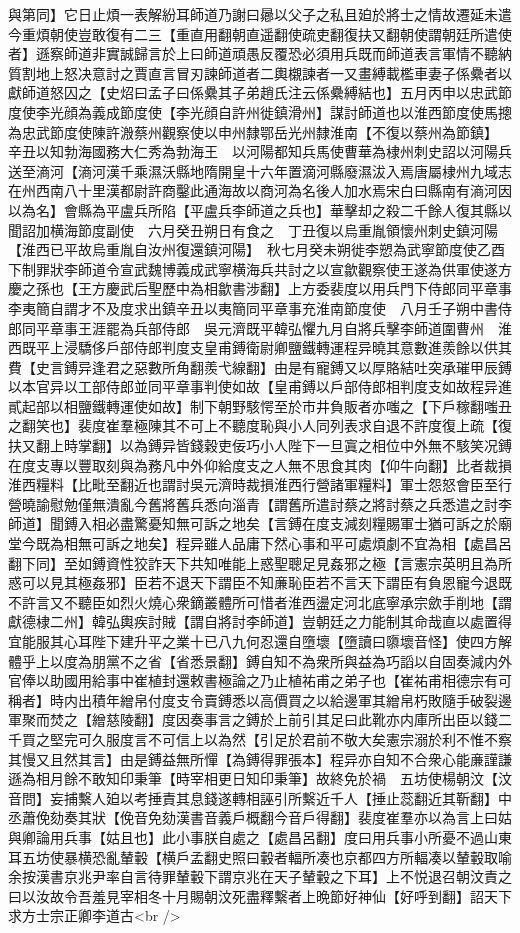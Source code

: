 與第同】它日止煩一表解紛耳師道乃謝曰曏以父子之私且廹於將士之情故遷延未遣今重煩朝使豈敢復有二三【重直用翻朝直遥翻使疏吏翻復扶又翻朝使謂朝廷所遣使者】遜察師道非實誠歸言於上曰師道頑愚反覆恐必須用兵既而師道表言軍情不聽納質割地上怒决意討之賈直言冒刃諫師道者二輿櫬諫者一又畫縛載檻車妻子係纍者以獻師道怒囚之【史炤曰孟子曰係纍其子弟趙氏注云係纍縛結也】五月丙申以忠武節度使李光顔為義成節度使【李光顔自許州徙鎮滑州】謀討師道也以淮西節度使馬摠為忠武節度使陳許溵蔡州觀察使以申州隸鄂岳光州隸淮南【不復以蔡州為節鎮】　辛丑以知勃海國務大仁秀為勃海王　以河陽都知兵馬使曹華為棣州刺史詔以河陽兵送至滳河【滳河漢千乘濕沃縣地隋開皇十六年置滴河縣廢濕沷入焉唐屬棣州九域志在州西南八十里漢都尉許商鑿此通海故以商河為名後人加水焉宋白曰縣南有滳河因以為名】會縣為平盧兵所陷【平盧兵李師道之兵也】華擊却之殺二千餘人復其縣以聞詔加横海節度副使　六月癸丑朔日有食之　丁丑復以烏重胤領懷州刺史鎮河陽【淮西已平故烏重胤自汝州復還鎮河陽】　秋七月癸未朔徙李愬為武寧節度使乙酉下制罪狀李師道令宣武魏博義成武寧横海兵共討之以宣歙觀察使王遂為供軍使遂方慶之孫也【王方慶武后聖歷中為相歙書涉翻】上方委裴度以用兵門下侍郎同平章事李夷簡自謂才不及度求出鎮辛丑以夷簡同平章事充淮南節度使　八月壬子朔中書侍郎同平章事王涯罷為兵部侍郎　吳元濟既平韓弘懼九月自將兵擊李師道圍曹州　淮西既平上浸驕侈戶部侍郎判度支皇甫鎛衛尉卿鹽鐵轉運程异曉其意數進羨餘以供其費【史言鎛异逢君之惡數所角翻羨弋線翻】由是有寵鎛又以厚賂結吐突承璀甲辰鎛以本官异以工部侍郎並同平章事判使如故【皇甫鎛以戶部侍郎相判度支如故程异進貳起部以相鹽鐵轉運使如故】制下朝野駭愕至於市井負販者亦嗤之【下戶稼翻嗤丑之翻笑也】裴度崔羣極陳其不可上不聽度恥與小人同列表求自退不許度復上疏【復扶又翻上時掌翻】以為鎛异皆錢穀吏佞巧小人陛下一旦寘之相位中外無不駭笑况鎛在度支專以豐取刻與為務凡中外仰給度支之人無不思食其肉【仰牛向翻】比者裁損淮西糧料【比毗至翻近也謂討吳元濟時裁損淮西行營諸軍糧料】軍士怨怒會臣至行營曉諭慰勉僅無潰亂今舊將舊兵悉向淄青【謂舊所遣討蔡之將討蔡之兵悉遣之討李師道】聞鎛入相必盡驚憂知無可訴之地矣【言鎛在度支減刻糧賜軍士猶可訴之於廟堂今既為相無可訴之地矣】程异雖人品庸下然心事和平可處煩劇不宜為相【處昌呂翻下同】至如鎛資性狡詐天下共知唯能上惑聖聰足見姦邪之極【言憲宗英明且為所惑可以見其極姦邪】臣若不退天下謂臣不知亷恥臣若不言天下謂臣有負恩寵今退既不許言又不聽臣如烈火燒心衆鏑叢體所可惜者淮西盪定河北底寧承宗歛手削地【謂獻德棣二州】韓弘輿疾討賊【謂自將討李師道】豈朝廷之力能制其命哉直以處置得宜能服其心耳陛下建升平之業十已八九何忍還自墮壞【墮讀曰隳壞音怪】使四方解體乎上以度為朋黨不之省【省悉景翻】鎛自知不為衆所與益為巧謟以自固奏減内外官俸以助國用給事中崔植封還敕書極論之乃止植祐甫之弟子也【崔祐甫相德宗有可稱者】時内出積年繒帛付度支令賣鎛悉以高價買之以給邊軍其繒帛朽敗隨手破裂邊軍聚而焚之【繒慈陵翻】度因奏事言之鎛於上前引其足曰此靴亦内庫所出臣以錢二千買之堅完可久服度言不可信上以為然【引足於君前不敬大矣憲宗溺於利不惟不察其慢又且然其言】由是鎛益無所憚【為鎛得罪張本】程异亦自知不合衆心能亷謹謙遜為相月餘不敢知印秉筆【時宰相更日知印秉筆】故終免於禍　五坊使楊朝汶【汶音問】妄捕繫人廹以考捶責其息錢遂轉相誣引所繫近千人【捶止蕊翻近其靳翻】中丞蕭俛劾奏其狀【俛音免劾漢書音義戶概翻今音戶得翻】裴度崔羣亦以為言上曰姑與卿論用兵事【姑且也】此小事朕自處之【處昌呂翻】度曰用兵事小所憂不過山東耳五坊使暴横恐亂輦轂【横戶孟翻史照曰轂者輻所凑也京都四方所輻凑以輦轂取喻余按漢書京兆尹率自言待罪輦轂下謂京兆在天子輦轂之下耳】上不悦退召朝汶責之曰以汝故令吾羞見宰相冬十月賜朝汶死盡釋繫者上晩節好神仙【好呼到翻】詔天下求方士宗正卿李道古<br />
